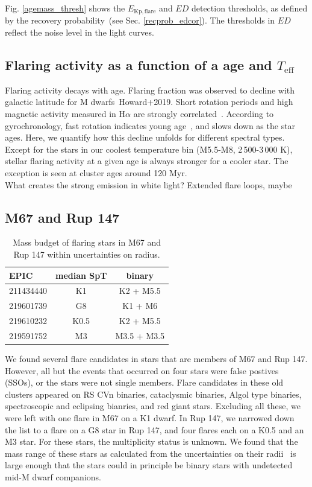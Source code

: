 \documentclass{aa}
\begin{document}
Fig. \ref{agemass_thresh} shows the $E_\mathrm{Kp,flare}$ and $ED$ detection thresholds, as defined by the recovery probability~(see Sec. \ref{recprob_edcor}). The thresholds in $ED$ reflect the noise level in the light curves.
\subsection{Flaring activity as a function of a age and $T_\mathrm{eff}$}
Flaring activity decays with age. Flaring fraction was observed to decline with galactic latitude for M dwarfs~\citep{hilton_dwarf_2010}Howard+2019. Short rotation periods and high magnetic activity measured in H$\alpha$ are strongly correlated~\citep{west_magneticrotationage_2015}. According to gyrochronology, fast rotation indicates young age~\citep{barnes_rotational_2003}, and slows down as the star ages. Here, we quantify how this decline unfolds for different spectral types. Except for the stars in our coolest temperature bin (M5.5-M8, 2\,500-3\,000 K), stellar flaring activity at a given age is always stronger for a cooler star. The exception is seen at cluster ages around 120 Myr.
\\
What creates the strong emission in white light? Extended flare loops, maybe~\citep{heinzel_flareloops_2018}
\subsection{M67 and Rup 147}
\begin{table}
\caption{Mass budget of flaring stars in M67 and Rup 147 within uncertainties on radius.}
\begin{tabular}{lcc}
\hline
 EPIC & median SpT &     binary \\
\hline
 211434440 &         K1 &    K2 + M5.5 \\
 219601739 &         G8 &      K1 + M6 \\
 219610232 &       K0.5 &    K2 + M5.5 \\
 219591752 &         M3 &  M3.5 + M3.5 \\
\hline
\end{tabular}
\end{table}
We found several flare candidates in stars that are members of M67 and Rup 147. However, all but the events that occurred on four stars were false postives (SSOs), or the stars were not single members. Flare candidates in these old clusters appeared on RS CVn binaries, cataclysmic binaries, Algol type binaries, spectroscopic and eclipsing bianries, and red giant stars. Excluding all these, we were left with one flare in M67 on a K1 dwarf. In Rup 147, we narrowed down the list to a flare on a G8 star in Rup 147, and four flares each on a K0.5 and an M3 star. For these stars, the multiplicity status is unknown. We found that the mass range of these stars as calculated from the uncertainties on their radii~\citep{eker2018} is large enough that the stars could in principle be binary stars with undetected mid-M dwarf companions.  
\end{document}
